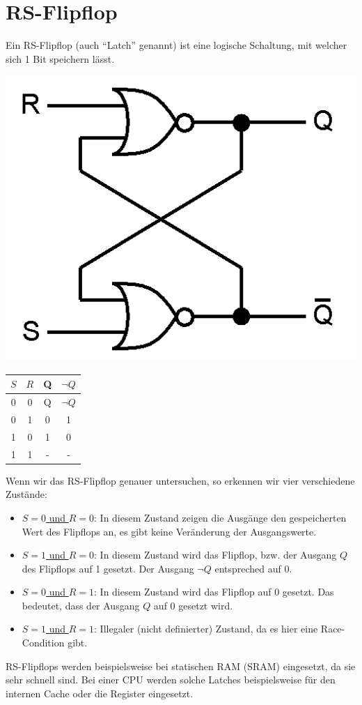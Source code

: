 \documentclass[a4paper,10pt]{report}
\begin{document}
\section{RS-Flipflop}
Ein RS-Flipflop (auch "`Latch"' genannt) ist eine logische Schaltung, mit welcher sich 1 Bit speichern lässt. 
\begin{center}
\includegraphics[scale=0.2]{imgs/SRGate.png}
\end{center}
\begin{center}\begin{tabular}{c c | c c}
$S$ & $R$ & Q & $\lnot Q$ \\ \hline
0 & 0 & Q & $\lnot Q$\\
0 & 1 & 0 & 1 \\
1 & 0 & 1 & 0 \\
1 & 1 & - & -\end{tabular}\end{center}
Wenn wir das RS-Flipflop genauer untersuchen, so erkennen wir vier verschiedene Zustände:
\begin{itemize}\item \underline{$S=0$ und $R=0$}: In diesem Zustand zeigen die Ausgänge den gespeicherten Wert des Flipflops an, es gibt keine Veränderung der Ausgangswerte.
\item \underline{$S=1$ und $R=0$}: In diesem Zustand wird das Flipflop, bzw. der Ausgang $Q$ des Flipflops auf 1 gesetzt. Der Ausgang $\lnot Q$ entspreched auf 0.
\item \underline{$S=0$ und $R=1$}: In diesem Zustand wird das Flipflop auf 0 gesetzt. Das bedeutet, dass der Ausgang $Q$ auf 0 gesetzt wird.
\item \underline{$S=1$ und $R=1$}: Illegaler (nicht definierter) Zustand, da es hier eine Race-Condition gibt. \end{itemize}
RS-Flipflops werden beispielsweise bei statischen RAM (SRAM) eingesetzt, da sie sehr schnell sind. Bei einer CPU werden solche Latches beispielsweise für den internen Cache oder die Register eingesetzt.
\end{document}
